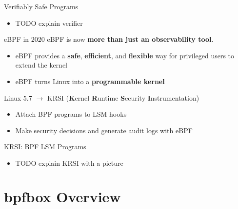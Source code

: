 \documentclass[12pt, dvipsnames, aspectratio=169]{beamer}
\begin{document}
\begin{frame}[c]{Verifiably Safe Programs}
\begin{itemize}
    \item TODO explain verifier
\end{itemize}
\end{frame}

\begin{frame}[c]{eBPF in 2020}
eBPF is now \textbf{more than just an observability tool}.
\begin{itemize}
    \item eBPF provides a \textbf{safe}, \textbf{efficient}, and \textbf{flexible} way for privileged users to extend the kernel
    \item eBPF turns Linux into a \textbf{programmable kernel}
\end{itemize}
\vfill
Linux 5.7 $\rightarrow$ KRSI (\textbf{K}ernel \textbf{R}untime \textbf{S}ecurity \textbf{I}nstrumentation)
\begin{itemize}
    \item Attach BPF programs to LSM hooks
    \item Make security decisions and generate audit logs with eBPF
\end{itemize}
\end{frame}

\begin{frame}[c]{KRSI: BPF LSM Programs}
\begin{itemize}
    \item TODO explain KRSI with a picture
\end{itemize}
\end{frame}

\section{bpfbox Overview}
\end{document}
